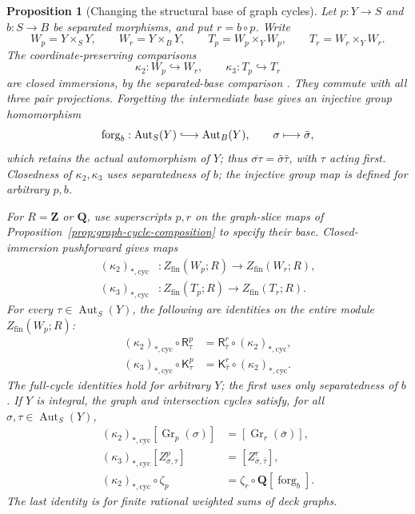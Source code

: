 \documentclass[11pt]{article}
\newtheorem{proposition}[theorem]{Proposition}
\theoremstyle{definition}
\theoremstyle{remark}
\newcommand{\Q}{\mathbf Q}
\begin{document}
\begin{proposition}[Changing the structural base of graph cycles]
\label{prop:graph-cycle-base-comparison}
Let \(p:Y\to S\) and \(b:S\to B\) be separated morphisms, and put
\(r=b\circ p\). Write
\[
  W_p=Y\times_S Y,\qquad W_r=Y\times_B Y,
  \qquad T_p=W_p\times_Y W_p,\qquad T_r=W_r\times_Y W_r.
\]
The coordinate-preserving comparisons
\[
  \kappa_2:W_p\hookrightarrow W_r,
  \qquad \kappa_3:T_p\hookrightarrow T_r
\]
are closed immersions, by the separated-base comparison
\cite{StacksRelativeProductClosedImmersion}. They commute with all three
pair projections. Forgetting the intermediate base gives an injective
group homomorphism
\[
  \operatorname{forg}_b:\operatorname{Aut}_S(Y)
      \lhook\joinrel\longrightarrow\operatorname{Aut}_B(Y),
  \qquad \sigma\longmapsto\bar\sigma,
\]
which retains the actual automorphism of \(Y\); thus
\(\overline{\sigma\tau}=\bar\sigma\bar\tau\), with \(\tau\) acting first.
Closedness of \(\kappa_2,\kappa_3\) uses separatedness of \(b\);
the injective group map is defined for arbitrary \(p,b\).

For \(R=\mathbf Z\) or \(\Q\), use superscripts \(p,r\) on the
graph-slice maps of Proposition~\ref{prop:graph-cycle-composition} to
specify their base. Closed-immersion pushforward gives maps
\[
\begin{aligned}
  (\kappa_2)_{*,\mathrm{cyc}}&:Z_{\mathrm{fin}}(W_p;R)
      \longrightarrow Z_{\mathrm{fin}}(W_r;R),\\
  (\kappa_3)_{*,\mathrm{cyc}}&:Z_{\mathrm{fin}}(T_p;R)
      \longrightarrow Z_{\mathrm{fin}}(T_r;R).
\end{aligned}
\]
For every \(\tau\in\operatorname{Aut}_S(Y)\), the following are
identities on the entire module \(Z_{\mathrm{fin}}(W_p;R)\):
\[
\begin{aligned}
  (\kappa_2)_{*,\mathrm{cyc}}\circ\mathsf R^p_\tau
    &=\mathsf R^r_{\bar\tau}\circ(\kappa_2)_{*,\mathrm{cyc}},\\
  (\kappa_3)_{*,\mathrm{cyc}}\circ\mathsf K^p_\tau
    &=\mathsf K^r_{\bar\tau}\circ(\kappa_2)_{*,\mathrm{cyc}}.
\end{aligned}
\]
The full-cycle identities hold for arbitrary \(Y\); the first uses only
separatedness of \(b\). If \(Y\) is integral, the graph
and intersection cycles satisfy, for all \(\sigma,\tau\in\operatorname{Aut}_S(Y)\),
\[
\begin{aligned}
  (\kappa_2)_{*,\mathrm{cyc}}[\operatorname{Gr}_p(\sigma)]
    &=[\operatorname{Gr}_r(\bar\sigma)],\\
  (\kappa_3)_{*,\mathrm{cyc}}[Z^p_{\sigma,\tau}]
    &=[Z^r_{\bar\sigma,\bar\tau}],\\
  (\kappa_2)_{*,\mathrm{cyc}}\circ\zeta_p
    &=\zeta_r\circ\Q[\operatorname{forg}_b].
\end{aligned}
\]
The last identity is for finite rational weighted sums of deck graphs.
\end{proposition}
\end{document}
